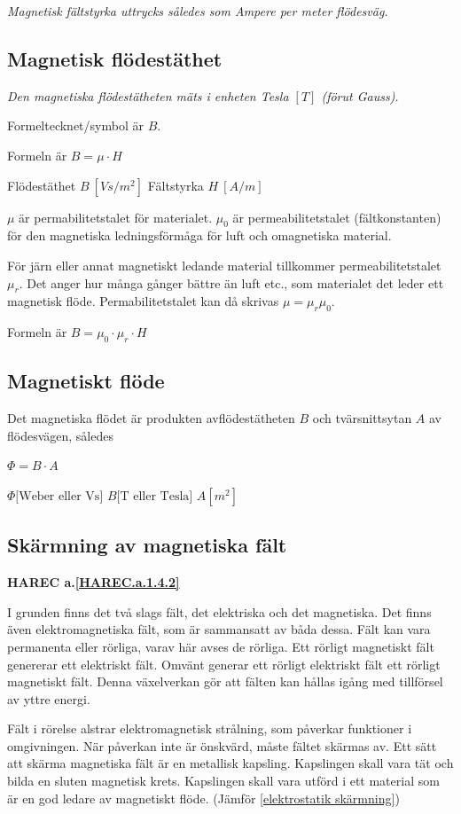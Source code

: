 \emph{Magnetisk fältstyrka uttrycks således som Ampere per meter flödesväg.}

\subsection{Magnetisk flödestäthet}

\emph{Den magnetiska flödestätheten mäts i enheten Tesla \([T]\) (förut Gauss).}

Formeltecknet/symbol är \(B\).

Formeln är \(B = \mu \cdot H\)

Flödestäthet \(B\ [Vs/m^2]\) Fältstyrka \(H\ [A/m]\)

\(\mu\) är permabilitetstalet för materialet.
\(\mu_0\) är permeabilitetstalet (fältkonstanten) för den magnetiska
ledningsförmåga för luft och omagnetiska material.

För järn eller annat magnetiskt ledande material tillkommer permeabilitetstalet
\(\mu_r\). Det anger hur många gånger bättre än luft etc., som materialet det
leder ett magnetisk flöde. Permabilitetstalet kan då skrivas
\(\mu = \mu_r\mu_0\).

Formeln är \(B = \mu_0 \cdot \mu_r \cdot H\)

\subsection{Magnetiskt flöde}

Det magnetiska flödet är produkten avflödestätheten \(B\) och tvärsnittsytan
\(A\) av flödesvägen, således

\(\Phi = B \cdot A\)

\(\Phi \text{[Weber eller Vs]}\) \(B \text{[T eller Tesla]}\) \(A [m^2]\)

\subsection{Skärmning av magnetiska fält}
\textbf{HAREC a.\ref{HAREC.a.1.4.2}\label{myHAREC.a.1.4.2}}
\label{elektromagnetisk skärmning}

I grunden finns det två slags fält, det elektriska och det magnetiska. Det
finns även elektromagnetiska fält, som är sammansatt av båda dessa. Fält kan
vara permanenta eller rörliga, varav här avses de rörliga. Ett rörligt
magnetiskt fält genererar ett elektriskt fält. Omvänt generar ett rörligt
elektriskt fält ett rörligt magnetiskt fält. Denna växelverkan gör att fälten
kan hållas igång med tillförsel av yttre energi.

Fält i rörelse alstrar elektromagnetisk strålning, som påverkar funktioner i
omgivningen. När påverkan inte är önskvärd, måste fältet skärmas av. Ett sätt
att skärma magnetiska fält är en metallisk kapsling. Kapslingen skall vara tät
och bilda en sluten magnetisk krets. Kapslingen skall vara utförd i ett
material som är en god ledare av magnetiskt flöde.
(Jämför \ref{elektrostatik skärmning})
